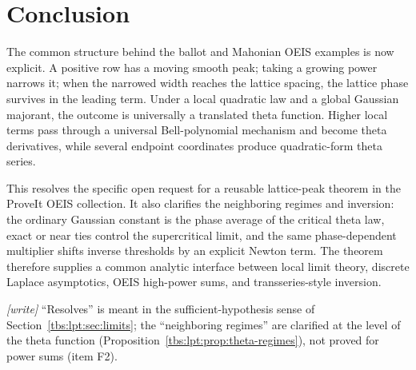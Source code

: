 \documentclass[11pt,a4paper]{article}
\numberwithin{equation}{section}
\theoremstyle{definition}
\begin{document}
\section{Conclusion}\label{tbs:lpt:sec:conclusion}

The common structure behind the ballot and Mahonian OEIS examples is now
explicit. A positive row has a moving smooth peak; taking a growing power
narrows it; when the narrowed width reaches the lattice spacing, the
lattice phase survives in the leading term. Under a local quadratic law
and a global Gaussian majorant, the outcome is universally a translated
theta function. Higher local terms pass through a universal
Bell-polynomial mechanism and become theta derivatives, while several
endpoint coordinates produce quadratic-form theta series.

This resolves the specific open request for a reusable lattice-peak
theorem in the ProveIt OEIS collection. It also clarifies the neighboring
regimes and inversion: the ordinary Gaussian constant is the phase
average of the critical theta law, exact or near ties control the
supercritical limit, and the same phase-dependent multiplier shifts
inverse thresholds by an explicit Newton term. The theorem therefore
supplies a common analytic interface between local limit theory, discrete
Laplace asymptotics, OEIS high-power sums, and transseries-style
inversion.

\emph{[write]} ``Resolves'' is meant in the sufficient-hypothesis sense of
Section~\ref{tbs:lpt:sec:limits}; the ``neighboring regimes'' are
clarified at the level of the theta function
(Proposition~\ref{tbs:lpt:prop:theta-regimes}), not proved for power sums
(item F2).


\appendix
\end{document}
